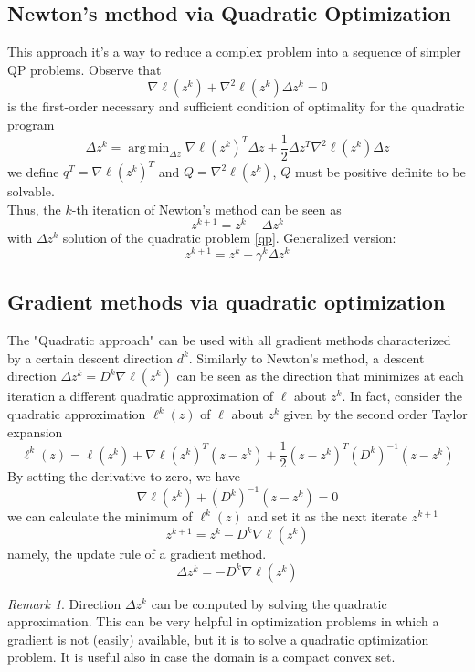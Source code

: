 \documentclass[openany]{book}
\DeclareMathOperator*{\argmin}{arg\,min}  %
\theoremstyle{definition}
\theoremstyle{remark}
\newtheorem*{remark}{Remark}
\begin{document}
\subsection{Newton's method via Quadratic Optimization}
This approach it's a way to reduce a complex problem into a sequence of simpler QP problems.
Observe that 
\[
    \nabla\ell(z^k) +\nabla^2\ell(z^k)\Delta z^k = 0
\]
is the first-order necessary and sufficient condition of optimality for the quadratic program 
\begin{equation}
    \label{qp}
    \Delta z^k = \argmin_{\Delta z}\nabla\ell(z^k)^T \Delta z+\displaystyle\frac{1}{2}\Delta z^T\nabla^2\ell(z^k)\Delta z
\end{equation}
we define $q^T = \nabla\ell(z^k)^T$ and $Q = \nabla^2\ell(z^k)$, $Q$ must be positive definite to be solvable.\\
Thus, the $k$-th iteration of Newton's method can be seen as 
\[
    z^{k+1} = z^k-\Delta z^k
\]
with $\Delta z^k$ solution of the quadratic problem \eqref{qp}. Generalized version: 
\[
    z^{k+1} = z^k - \gamma^k \Delta z^k
\]

\subsection{Gradient methods via quadratic optimization}
The "Quadratic approach" can be used with all gradient methods characterized by a certain descent direction $d^k$.
Similarly to Newton's method, a descent direction $\Delta z^k=D^k\nabla\ell(z^k)$ can be seen as the direction that minimizes at each iteration a different quadratic approximation of $\ell$ about $z^k$. 
In fact, consider the quadratic approximation $\ell^k(z)$ of $ \ell$ about $z^k$ given by the second order Taylor expansion
\[
    \ell^k(z) = \ell(z^k)+\nabla\ell(z^k)^T(z-z^k)+\displaystyle\frac{1}{2}(z-z^k)^T(D^k)^{-1}(z-z^k)
\]
By setting the derivative to zero, we have 
\[
    \nabla\ell(z^k)+(D^k)^{-1}(z-z^k)=0
\]
we can calculate the minimum of $\ell^k(z)$ and set it as the next iterate $z^{k+1}$
\[
    z^{k+1} = z^k - D^k\nabla\ell(z^k)
\]
namely, the update rule of a gradient method.
\[
    \Delta z^k = -D^k\nabla\ell(z^k)
\]
\begin{remark}
    Direction $\Delta z^k$ can be computed by solving the quadratic approximation. This can be very
    helpful in optimization problems in which a gradient is not (easily) available, but it is to solve a quadratic
    optimization problem. It is useful also in case the domain is a compact convex set.
\end{remark}
\end{document}
